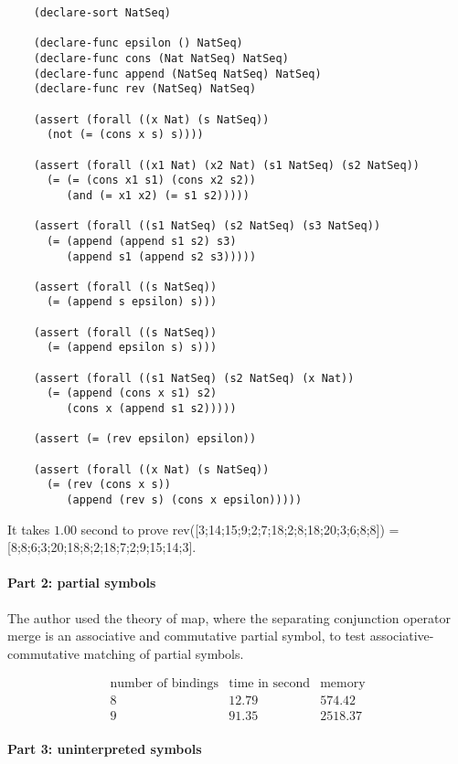 \documentclass{article}
\theoremstyle{plain}
\begin{document}
\begin{lstlisting}
	(declare-sort NatSeq)
	
	(declare-func epsilon () NatSeq)
	(declare-func cons (Nat NatSeq) NatSeq)
	(declare-func append (NatSeq NatSeq) NatSeq)
	(declare-func rev (NatSeq) NatSeq)
	
	(assert (forall ((x Nat) (s NatSeq))
	  (not (= (cons x s) s))))
	
	(assert (forall ((x1 Nat) (x2 Nat) (s1 NatSeq) (s2 NatSeq))
	  (= (= (cons x1 s1) (cons x2 s2))
	     (and (= x1 x2) (= s1 s2)))))
	
	(assert (forall ((s1 NatSeq) (s2 NatSeq) (s3 NatSeq))
	  (= (append (append s1 s2) s3)
	     (append s1 (append s2 s3)))))
	
	(assert (forall ((s NatSeq))
	  (= (append s epsilon) s)))
	
	(assert (forall ((s NatSeq))
	  (= (append epsilon s) s)))
	
	(assert (forall ((s1 NatSeq) (s2 NatSeq) (x Nat))
	  (= (append (cons x s1) s2)
	     (cons x (append s1 s2)))))
		
	(assert (= (rev epsilon) epsilon))
	
	(assert (forall ((x Nat) (s NatSeq))
	  (= (rev (cons x s))
	     (append (rev s) (cons x epsilon)))))
\end{lstlisting}
It takes $1.00$ second to prove \textsf{\small rev([3;14;15;9;2;7;18;2;8;18;20;3;6;8;8]) = [8;8;6;3;20;18;8;2;18;7;2;9;15;14;3]}.

\paragraph{Part 2: partial symbols} The author used the theory of map, where the separating conjunction operator \textsf{\small merge} is an associative and commutative partial symbol, to test associative-commutative matching of partial symbols.

\begin{equation*}
\begin{array}{ccc}
	\text{number of bindings} & \text{time in second} & \text{memory} \\ 
	8 & 12.79 & 574.42 \\ 
	9 & 91.35 & 2518.37
\end{array}
\end{equation*}

\paragraph{Part 3: uninterpreted symbols} 
\end{document}
